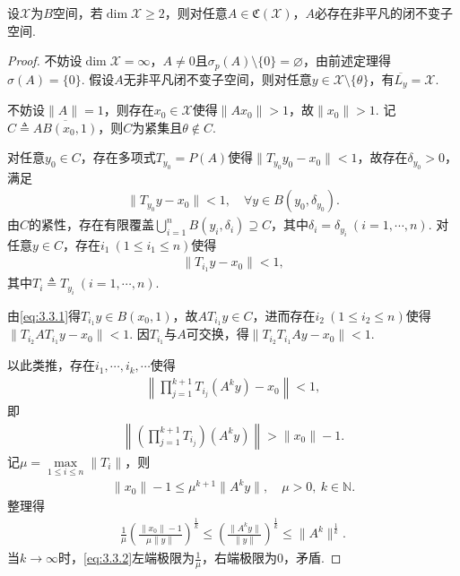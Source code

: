 \documentclass[../../main.tex]{subfiles}%
\begin{document}
\begin{theorem}
设$\mathscr{X}$为$B$空间，若$\dim\mathscr{X}\geqslant2$，则对任意$A\in\mathfrak{C}(\mathscr{X})$，$A$必存在非平凡的闭不变子空间.
\end{theorem}
\begin{proof}

不妨设$\dim\mathscr{X}=\infty$，$A\neq0$且$\sigma_p(A)\setminus\{0\}=\varnothing $，由前述定理得$\sigma(A)=\{0\}$.
假设$A$无非平凡闭不变子空间，则对任意$y\in\mathscr{X}\setminus\{\theta\}$，有$\overline{L_y}=\mathscr{X}$.

不妨设$\|A\|=1$，则存在$x_0\in\mathscr{X}$使得$\|Ax_0\|>1$，故$\|x_0\|>1$.
记$C\triangleq\overline{AB(x_0,1)}$，则$C$为紧集且$\theta\notin C$.

对任意$y_0\in C$，存在多项式$T_{y_0}=P(A)$使得$\|T_{y_0}y_0-x_0\|<1$，故存在$\delta_{y_0}>0$，满足
\begin{align*}
\|T_{y_0}y-x_0\|<1,\quad \forall y\in B(y_0,\delta_{y_0}).
\end{align*}
由$C$的紧性，存在有限覆盖$\bigcup\limits_{i=1}^n B(y_i,\delta_i)\supseteq C$，其中$\delta_i=\delta_{y_i}\ (i=1,\cdots,n)$.
对任意$y\in C$，存在$i_1\ (1\leqslant i_1\leqslant n)$使得
\begin{align}\label{eq:3.3.1}
\|T_{i_1}y-x_0\|<1,
\end{align}
其中$T_i\triangleq T_{y_i}\ (i=1,\cdots,n)$.

由\eqref{eq:3.3.1}得$T_{i_1}y\in B(x_0,1)$，故$AT_{i_1}y\in C$，进而存在$i_2\ (1\leqslant i_2\leqslant n)$使得$\|T_{i_2}AT_{i_1}y-x_0\|<1$.
因$T_{i_1}$与$A$可交换，得$\|T_{i_2}T_{i_1}Ay-x_0\|<1$.

以此类推，存在$i_1,\cdots,i_k,\cdots$使得
\begin{align*}
\left\|\prod\limits_{j=1}^{k+1}T_{i_j}(A^k y)-x_0\right\|<1,
\end{align*}
即
\begin{align*}
\left\|\left(\prod\limits_{j=1}^{k+1}T_{i_j}\right)(A^k y)\right\|>\|x_0\|-1.
\end{align*}
记$\mu=\max\limits_{1\leqslant i\leqslant n}\|T_i\|$，则
\begin{align*}
\|x_0\|-1\leqslant\mu^{k+1}\|A^k y\|,\quad \mu>0,\ k\in\mathbb{N}.
\end{align*}
整理得
\begin{align}\label{eq:3.3.2}
\frac1\mu\left(\frac{\|x_0\|-1}{\mu\|y\|}\right)^{\frac1k}\leqslant\left(\frac{\|A^k y\|}{\|y\|}\right)^{\frac1k}\leqslant\|A^k\|^{\frac1k}.
\end{align}
当$k\to\infty$时，\eqref{eq:3.3.2}左端极限为$\frac1\mu$，右端极限为$0$，矛盾.

\end{proof}
\end{document}
